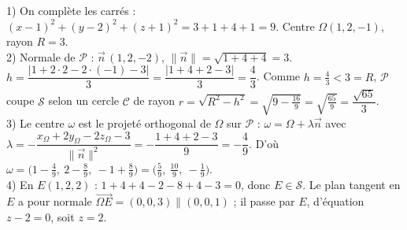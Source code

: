 1) On complète les carrés : $(x-1)^{2}+(y-2)^{2}+(z+1)^{2}=3+1+4+1=9$.
Centre $\Omega(1,2,-1)$, rayon $R=3$.\\
2) Normale de $\mathcal P$ : $\vec n\,(1,2,-2)$, $\|\vec n\|=\sqrt{1+4+4}=3$.
$h=\dfrac{|1+2\cdot2-2\cdot(-1)-3|}{3}=\dfrac{|1+4+2-3|}{3}=\dfrac{4}{3}$.
Comme $h=\tfrac43<3=R$, $\mathcal P$ coupe $\mathcal S$ selon un cercle $\mathcal C$ de rayon
$r=\sqrt{R^{2}-h^{2}}=\sqrt{9-\tfrac{16}9}=\sqrt{\tfrac{65}9}=\dfrac{\sqrt{65}}{3}$.\\
3) Le centre $\omega$ est le projeté orthogonal de $\Omega$ sur $\mathcal P$ :
$\omega=\Omega+\lambda\vec n$ avec
$\lambda=-\dfrac{x_\Omega+2y_\Omega-2z_\Omega-3}{\|\vec n\|^{2}}=-\dfrac{1+4+2-3}{9}=-\dfrac{4}{9}$.
D'où $\omega=\big(1-\tfrac49,\ 2-\tfrac89,\ -1+\tfrac89\big)=\big(\tfrac59,\ \tfrac{10}9,\ -\tfrac19\big)$.\\
4) En $E(1,2,2)$ : $1+4+4-2-8+4-3=0$, donc $E\in\mathcal S$. Le plan tangent en $E$ a pour
normale $\overrightarrow{\Omega E}=(0,0,3)\parallel(0,0,1)$ ; il passe par $E$, d'équation
$z-2=0$, soit $\boxed{z=2}$.
